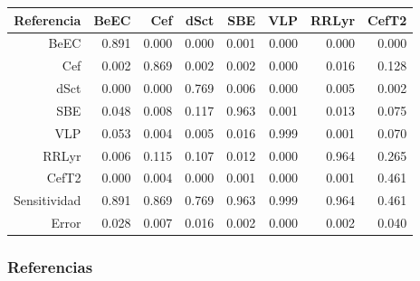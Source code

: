 \documentclass{beamer}
\begin{document}
\begin{frame}
  \begin{table}[ht]
    \centering
    \resizebox{0.7\textwidth}{!} {
      \begin{tabular}{rrrrrrrr}
        \hline
        Referencia & BeEC & Cef & dSct & SBE & VLP & RRLyr & CefT2 \\ 
        \hline
        BeEC & 0.891 & 0.000 & 0.000 & 0.001 & 0.000 & 0.000 & 0.000 \\ 
        Cef & 0.002 & 0.869 & 0.002 & 0.002 & 0.000 & 0.016 & 0.128 \\ 
        dSct & 0.000 & 0.000 & 0.769 & 0.006 & 0.000 & 0.005 & 0.002 \\ 
        SBE & 0.048 & 0.008 & 0.117 & 0.963 & 0.001 & 0.013 & 0.075 \\ 
        VLP & 0.053 & 0.004 & 0.005 & 0.016 & 0.999 & 0.001 & 0.070 \\ 
        RRLyr & 0.006 & 0.115 & 0.107 & 0.012 & 0.000 & 0.964 & 0.265 \\ 
        CefT2 & 0.000 & 0.004 & 0.000 & 0.001 & 0.000 & 0.001 & 0.461 \\
        \hline
        \hline
        Sensitividad &  0.891 & 0.869 & 0.769 & 0.963 & 0.999 & 0.964 & 0.461 \\ 
        \hline
        Error & 0.028 & 0.007 & 0.016 & 0.002 & 0.000 & 0.002 & 0.040 \\ 
        \hline
        \hline
      \end{tabular}
    }
  \end{table}
\end{frame}

\begin{frame}[allowframebreaks]
  \frametitle{Referencias}
  
  
\end{frame}
\end{document}
